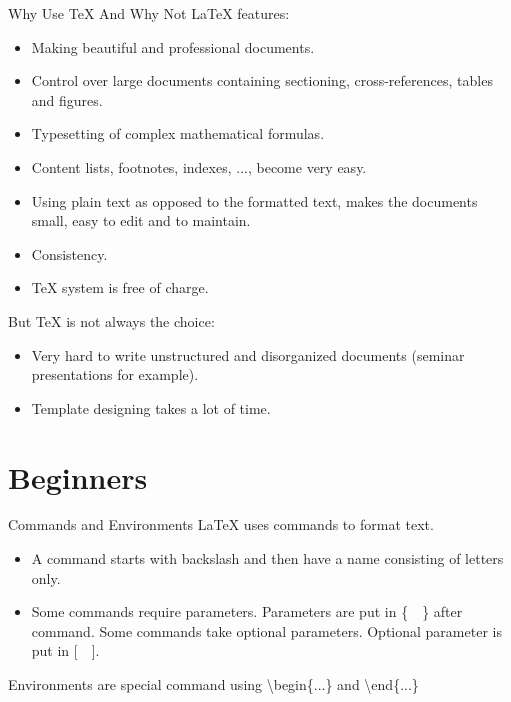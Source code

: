 \documentclass[10pt]{beamer}
\begin{document}
\begin{frame}{Why Use \TeX{} And Why Not}
\LaTeX{} features:
\begin{itemize}
    \item Making beautiful and professional documents.
    \item Control over large documents containing sectioning,
        cross-references, tables and figures.
    \item Typesetting of complex mathematical formulas.
    \item Content lists, footnotes, indexes, ..., become very easy.
    \item Using plain text as opposed to the formatted text,
        makes the documents small, easy to edit and to maintain.
    \item Consistency.
    \item \TeX{} system is free of charge.
\end{itemize}

    But \TeX{} is not always the choice:
\begin{itemize}
    \item Very hard to write unstructured and disorganized documents
        (seminar presentations for example).
    \item Template designing takes a lot of time.
\end{itemize}
\end{frame}

\section{Beginners}
\begin{frame}{\TeX{} Source File}
TeX},
    morekeywords={maketitle},keywordstyle=\color{red}]{einstein.tex}
\end{frame}

\begin{frame}[t]{Commands and Environments}
    \LaTeX{} uses commands to format text.
\begin{itemize}
    \item A command starts with backslash and then have a name
        consisting of letters only.
    \item Some commands require parameters. Parameters are put in
        \{\ \ \} after command. Some commands take optional parameters.
        Optional parameter is put in [\ \ ].\\[2ex]

\end{itemize}

    Environments are special command using \textbackslash begin\{...\}
    and \textbackslash end\{...\}

\end{frame}
\end{document}
